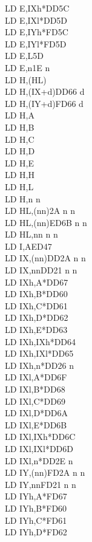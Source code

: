 \documentclass[oneside,a4paper]{book}
\begin{document}
\begin{multicols}{3}
{\begin{tabbing}
LD E,IXh*\>DD5C\\
LD E,IXl*\>DD5D\\
LD E,IYh*\>FD5C\\
LD E,IYl*\>FD5D\\
LD E,L\>5D\\
LD E,n\>1E n\\
LD H,(HL)\\
LD H,(IX+d)\>DD66 d\\
LD H,(IY+d)\>FD66 d\\
LD H,A\\
LD H,B\\
LD H,C\\
LD H,D\\
LD H,E\\
LD H,H\\
LD H,L\\
LD H,n n\\
LD HL,(nn)\>2A n n\\
LD HL,(nn)\>ED6B n n\\
LD HL,nn n n\\
LD I,A\>ED47\\
LD IX,(nn)\>DD2A n n\\
LD IX,nn\>DD21 n n\\
LD IXh,A*\>DD67\\
LD IXh,B*\>DD60\\
LD IXh,C*\>DD61\\
LD IXh,D*\>DD62\\
LD IXh,E*\>DD63\\
LD IXh,IXh*\>DD64\\
LD IXh,IXl*\>DD65\\
LD IXh,n*\>DD26 n \\
LD IXl,A*\>DD6F\\
LD IXl,B*\>DD68\\
LD IXl,C*\>DD69\\
LD IXl,D*\>DD6A\\
LD IXl,E*\>DD6B\\
LD IXl,IXh*\>DD6C\\
LD IXl,IXl*\>DD6D\\
LD IXl,n*\>DD2E n\\
LD IY,(nn)\>FD2A n n\\
LD IY,nn\>FD21 n n\\
LD IYh,A*\>FD67\\
LD IYh,B*\>FD60\\
LD IYh,C*\>FD61\\
LD IYh,D*\>FD62\\

\end{tabbing}}
\end{multicols}
\end{document}
